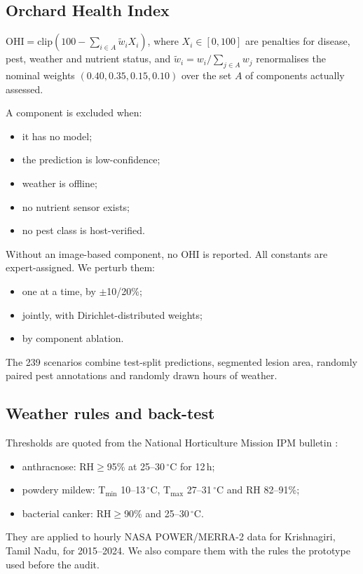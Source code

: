 \documentclass[conference]{IEEEtran}
\begin{document}
\subsection{Orchard Health Index}\label{sec:ohi}
$\mathrm{OHI}=\mathrm{clip}(100-\sum_{i\in A}\tilde w_i X_i)$, where $X_i\in[0,100]$ are penalties for disease,
pest, weather and nutrient status, and $\tilde w_i=w_i/\sum_{j\in A}w_j$ renormalises the nominal weights
$(0.40,0.35,0.15,0.10)$ over the set $A$ of components actually assessed.

A component is excluded when:
\begin{itemize}
\item it has no model;
\item the prediction is low-confidence;
\item weather is offline;
\item no nutrient sensor exists;
\item no pest class is host-verified.
\end{itemize}
Without an image-based component, no OHI is reported. All constants are expert-assigned. We perturb them:
\begin{itemize}
\item one at a time, by $\pm$10/20\%;
\item jointly, with Dirichlet-distributed weights;
\item by component ablation.
\end{itemize}
The 239 scenarios combine test-split predictions, segmented lesion area, randomly paired pest annotations and
randomly drawn hours of weather.

\subsection{Weather rules and back-test}\label{sec:forecast}
Thresholds are quoted from the National Horticulture Mission IPM bulletin \cite{nhm2012ipmmango}:
\begin{itemize}
\item anthracnose: RH${\ge}$95\% at 25--30\,$^\circ$C for 12\,h;
\item powdery mildew: T$_{\min}$ 10--13\,$^\circ$C, T$_{\max}$ 27--31\,$^\circ$C and RH 82--91\%;
\item bacterial canker: RH${\ge}$90\% and 25--30\,$^\circ$C.
\end{itemize}
They are applied to hourly NASA POWER/MERRA-2 \cite{gelaro2017merra2} data for Krishnagiri, Tamil Nadu, for
2015--2024. We also compare them with the rules the prototype used before the audit.
\end{document}
